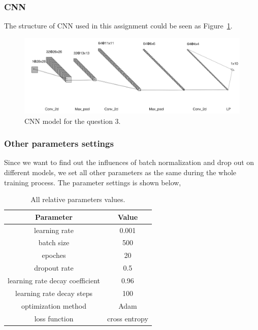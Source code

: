 \documentclass[12pt,letterpaper]{article}
\begin{document}
\subsubsection*{CNN}

The structure of CNN used in this assignment could be seen as Figure~\ref{fig:CNN}.
\begin{figure}[h]
    \centering
    \includegraphics[width=.9\linewidth]{CNN.jpg}
    \caption{\small CNN model for the question 3.}
    \label{fig:CNN}
\end{figure}

\subsubsection*{Other parameters settings}

Since we want to find out the influences of batch normalization and drop out on different models, we set all other parameters as the same during the whole training process. The parameter settings is shown below,
\begin{table}[h]
        \centering
        \vspace{\baselineskip}
        \caption{All relative parameters values.}\label{T:parameters}
      \begin{tabular}{cc}
        \hline
        Parameter & Value\\
        \hline
        learning rate & 0.001\\
        batch size & 500\\
        epoches &  20\\
        dropout rate &  0.5\\
        learning rate decay coefficient &  0.96\\
        learning rate decay steps &  100\\
        optimization method &  Adam\\
        loss function &  cross entropy\\
        \hline
      \end{tabular}
\end{table}
\end{document}
